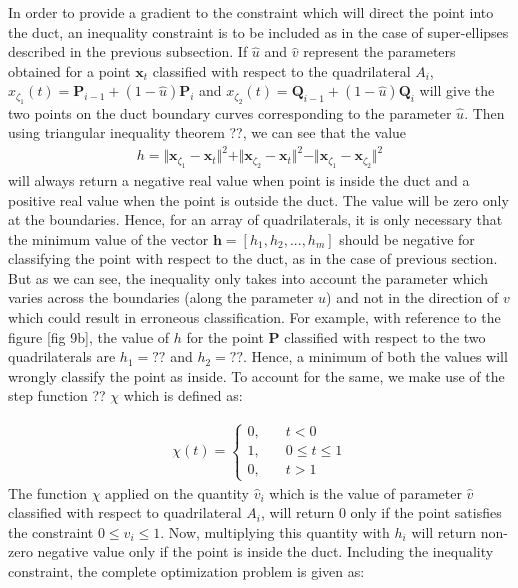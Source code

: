 \documentclass[11pt,a4paper]{article}
\begin{document}
In order to provide a gradient to the constraint which will direct the point into the duct, an inequality constraint is to be included as in the case of super-ellipses described in the previous subsection. If $\hat{u}$ and $\hat{v}$ represent the parameters obtained for a point $\mathbf{x}_t$ classified with respect to the quadrilateral $A_i$, $x_{\zeta_1}(t) = \mathbf{P}_{i-1}+\left(1-{\hat{u}} \right)\mathbf{P}_i$ and $x_{\zeta_2}(t) = \mathbf{Q}_{i-1}+\left(1-{\hat{u}} \right)\mathbf{Q}_i$ will give the two points on the duct boundary curves corresponding to the parameter $\hat{u}$. Then using triangular inequality theorem ??, we can see that the value
\begin{align}
\label{eq:ductgradientinquad}
h = \Vert \mathbf{x}_{\zeta_1}-\mathbf{x}_t\Vert^2+\Vert \mathbf{x}_{\zeta_2}-\mathbf{x}_t\Vert^2-\Vert \mathbf{x}_{\zeta_1}- \mathbf{x}_{\zeta_2}\Vert^2
\end{align}
will always return a negative real value when point is inside the duct and a positive real value when the point is outside the duct. The value will be zero only at the boundaries. Hence, for an array of quadrilaterals, it is only necessary that the minimum value of the vector $\mathbf{h} = [{h}_1, {h}_2,...,{h}_m]$ should be negative for classifying the point with respect to the duct, as in the case of previous section. But as we can see, the inequality only takes into account the parameter which varies across the boundaries (along the parameter $u$) and not in the direction of $v$ which could result in erroneous classification. For example, with reference to the figure [fig 9b], the value of $h$ for the point $\mathbf{P}$ classified with respect to the two quadrilaterals are $h_1 = ??$ and $h_2 = ??$. Hence, a minimum of both the values will wrongly classify the point as inside. To account for the same, we make use of the step function ?? $\chi$ which is defined as:

\begin{align}
\label{eq:chifunction}
\chi(t) = \left\lbrace \begin{matrix}
0,&\quad t<0 \\
1,&\quad 0\leq t \leq 1\\
0, &\quad t >1
\end{matrix}\right.
\end{align}
The function $\chi$ applied on the quantity $\hat{v}_i$ which is the value of parameter $\hat{v}$ classified with respect to quadrilateral $A_i$, will return 0 only if the point satisfies the constraint $0\leq \hat{v}_i\leq 1$. Now, multiplying this quantity with $h_i$ will return non-zero negative value only if the point is inside the duct. Including the inequality constraint, the complete optimization problem is given as:
\end{document}
